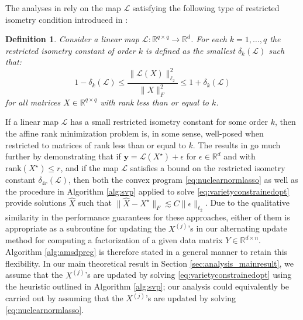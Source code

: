 \documentclass[11pt,letterpaper]{article}
\newtheorem{definition}{Definition}
\newcommand{\R}{\mathbb{R}}
\newcommand{\by}{\mathbf{y}}
\renewcommand{\L}{\mathcal{L}}
\begin{document}
The analyses in \cite{FCRP:08,GM:11,JMD:10,RFP:10} rely on the map $\L$ satisfying the following type of restricted isometry condition introduced in \cite{RFP:10}:
\begin{definition} Consider a linear map $\L : \R^{q \times q} \rightarrow \R^d$.  For each $k = 1,\dots,q$ the \emph{restricted isometry constant of order $k$} is defined as the smallest $\delta_k(\L)$ such that:
\begin{equation*}
1-\delta_k(\L) \leq \frac{\|\L(X)\|_{\ell_2}^2}{\|X\|_F^2} \leq 1 + \delta_k(\L)
\end{equation*}
for all matrices $X \in \R^{q \times q}$ with rank less than or equal to $k$.
\end{definition}
If a linear map $\L$ has a small restricted isometry constant for some order $k$, then the affine rank minimization problem is, in some sense, well-posed when restricted to matrices of rank less than or equal to $k$.  The results in \cite{FCRP:08,GM:11,JMD:10,RFP:10} go much further by demonstrating that if $\by = \L(X^\star) + \epsilon$ for $\epsilon \in \R^d$ and with $\mathrm{rank}(X^\star) \leq r$, and if the map $\L$ satisfies a bound on the restricted isometry constant $\delta_{4r}(\L)$, then both the convex program \eqref{eq:nuclearnormlasso} as well as the procedure in Algorithm \ref{alg:svp} applied to solve \eqref{eq:varietyconstrainedopt} provide solutions $\hat{X}$ such that $\|\hat{X} - X^\star\|_F \lesssim C \|\epsilon\|_{\ell_2}$.  Due to the qualitative similarity in the performance guarantees for these approaches, either of them is appropriate as a subroutine for updating the $X^{(j)}$'s in our alternating update method for computing a factorization of a given data matrix $Y \in \R^{d \times n}$.  Algorithm \ref{alg:amsdpreg} is therefore stated in a general manner to retain this flexibility.  In our main theoretical result in Section \ref{sec:analysis_mainresult}, we assume that the $X^{(j)}$'s are updated by solving \eqref{eq:varietyconstrainedopt} using the heuristic outlined in Algorithm \ref{alg:svp}; our analysis could equivalently be carried out by assuming that the $X^{(j)}$'s are updated by solving \eqref{eq:nuclearnormlasso}.
%
\end{document}
